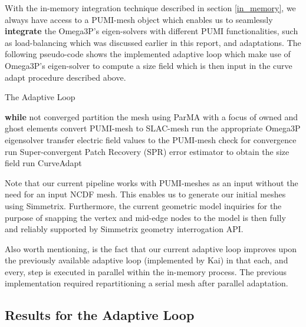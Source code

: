 \documentclass[review,12pt]{elsarticle_summary_report}
\begin{document}
With the in-memory integration technique described in section \ref{in_memory}, we always have access to a PUMI-mesh object which enables us to seamlessly \textbf{integrate} the Omega3P's eigen-solvers with different PUMI functionalities, such as load-balancing which was discussed earlier in this report, and adaptations. The following pseudo-code shows the implemented adaptive loop which make use of Omega3P's eigen-solver to compute a size field which is then input in the curve adapt procedure described above.

\begin{algorithm}
\caption{The Adaptive Loop}\label{adapt_loop}
\begin{algorithmic}[1]
\State \textbf{while} not converged
\State \quad partition the mesh using ParMA with a focus of owned and ghost elements
\State \quad convert PUMI-mesh to SLAC-mesh
\State \quad run the appropriate Omega3P eigensolver
\State \quad transfer electric field values to the PUMI-mesh
\State \quad check for convergence
\State \quad run Super-convergent Patch Recovery (SPR) error estimator to obtain the size field
\State \quad run CurveAdapt
\end{algorithmic}
\end{algorithm}

Note that our current pipeline works with PUMI-meshes as an input without the need for an input NCDF mesh. This enables us to generate our initial meshes using Simmetrix. Furthermore, the current geometric model inquiries for the purpose of snapping the vertex and mid-edge nodes to the model is then fully and reliably supported by Simmetrix geometry interrogation API. 

Also worth mentioning, is the fact that our current adaptive loop improves upon the previously available adaptive loop (implemented by Kai) in that each, and every, step is executed in parallel within the in-memory process. The previous implementation required repartitioning a serial mesh after parallel adaptation.

\subsection{Results for the Adaptive Loop}
\end{document}
